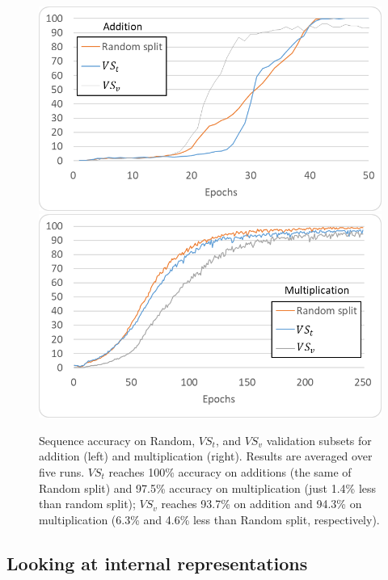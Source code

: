 \documentclass[final,1p,times,authoryear]{elsarticle}
\begin{document}
\begin{figure}[h]
\begin{center}
\includegraphics[scale=1.05]{VStVSvSeqAccuracyAdd}
\includegraphics[scale=1.05]{VStVSvSeqAccuracyMul}
\end{center}
\caption{Sequence accuracy on Random, $VS_t$, and $VS_v$ validation subsets for addition (left) and multiplication (right). Results are averaged over five runs. $VS_t$ reaches 100\% accuracy on additions (the same of Random split) and 97.5\% accuracy on multiplication (just 1.4\% less than random split); $VS_v$ reaches 93.7\% on addition and 94.3\% on multiplication (6.3\% and 4.6\% less than Random split, respectively).}
\label{figure:VStVSvSeqAccuracy}
\end{figure}

\subsection{Looking at internal representations} \label{subsec:LookingAtInternalRepresentations}
\end{document}
